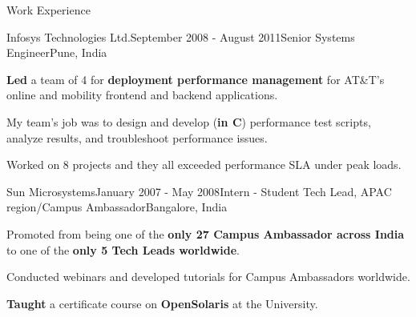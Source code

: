 \documentclass{resume} %
\begin{document}
\begin{rSection}{Work Experience}
\begin{rSubsection}{Infosys Technologies Ltd.}{September 2008 - August
2011}{Senior Systems Engineer}{Pune, India}
\item \textbf{Led} a team of 4 for \textbf{deployment performance management}
for AT\&T's online and mobility frontend and backend applications.
\begin{lsubSubsection}
\item My team's job was to design and develop (\textbf{in C}) performance
test scripts, analyze results, and troubleshoot performance issues.  
\item {Worked on 8 projects} and they all exceeded performance SLA under
peak loads.
\end{lsubSubsection}
\end{rSubsection}


\begin{rSubsection}{Sun Microsystems}{January 2007 - May 2008}{Intern - Student
Tech Lead, APAC region/Campus Ambassador}{Bangalore, India}
\item Promoted from being one of the \textbf{only 27 Campus Ambassador across India}
to one of the \textbf{only 5 Tech Leads worldwide}.  
\begin{lsubSubsection}
\item Conducted webinars and developed tutorials for Campus Ambassadors
worldwide.
\item \textbf{Taught} a certificate course on \textbf{OpenSolaris} at the
  University.
\end{lsubSubsection}
\end{rSubsection}
\end{rSection}
\end{document}
